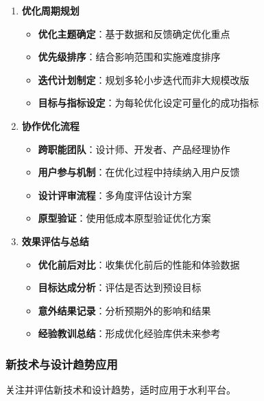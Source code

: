 \begin{enumerate}
\def\labelenumi{\arabic{enumi}.}
\tightlist
\item
  \textbf{优化周期规划}

  \begin{itemize}
  \tightlist
  \item
    \textbf{优化主题确定}：基于数据和反馈确定优化重点
  \item
    \textbf{优先级排序}：结合影响范围和实施难度排序
  \item
    \textbf{迭代计划制定}：规划多轮小步迭代而非大规模改版
  \item
    \textbf{目标与指标设定}：为每轮优化设定可量化的成功指标
  \end{itemize}
\item
  \textbf{协作优化流程}

  \begin{itemize}
  \tightlist
  \item
    \textbf{跨职能团队}：设计师、开发者、产品经理协作
  \item
    \textbf{用户参与机制}：在优化过程中持续纳入用户反馈
  \item
    \textbf{设计评审流程}：多角度评估设计方案
  \item
    \textbf{原型验证}：使用低成本原型验证优化方案
  \end{itemize}
\item
  \textbf{效果评估与总结}

  \begin{itemize}
  \tightlist
  \item
    \textbf{优化前后对比}：收集优化前后的性能和体验数据
  \item
    \textbf{目标达成分析}：评估是否达到预设目标
  \item
    \textbf{意外结果记录}：分析预期外的影响和结果
  \item
    \textbf{经验教训总结}：形成优化经验库供未来参考
  \end{itemize}
\end{enumerate}

\subsubsection{新技术与设计趋势应用}\label{ux65b0ux6280ux672fux4e0eux8bbeux8ba1ux8d8bux52bfux5e94ux7528}

关注并评估新技术和设计趋势，适时应用于水利平台。

